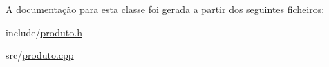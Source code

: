 A documentação para esta classe foi gerada a partir dos seguintes ficheiros\-:\begin{DoxyCompactItemize}
\item 
include/\hyperlink{produto_8h}{produto.\-h}\item 
src/\hyperlink{produto_8cpp}{produto.\-cpp}\end{DoxyCompactItemize}
